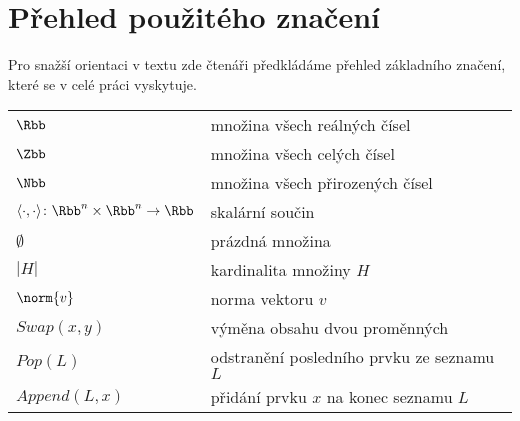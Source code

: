 \chapter*{Přehled použitého značení}

Pro snažší orientaci v textu zde čtenáři předkládáme přehled základního značení, které se v celé práci vyskytuje.
\begin{flushleft}
\begin{longtable}[l]{ll} %
  $\Rbb$                    & množina všech reálných čísel \\[1mm]
  $\Zbb$                    & množina všech celých čísel \\[1mm]
  $\Nbb$                    & množina všech přirozených čísel\\[1mm]
  $ \langle \cdot, \cdot \rangle \colon \Rbb^n \times \Rbb^n \to \Rbb $ & skalární součin \\[1mm]
  $ \emptyset $            & prázdná množina \\[1mm]
  $ |H| $                  & kardinalita množiny $H$ \\[1mm]
  $ \norm{v} $             & norma vektoru $v$ \\[1mm]
  $ Swap(x, y) $           & výměna obsahu dvou proměnných \\[1mm]
  $ Pop(L) $               & odstranění posledního prvku ze seznamu $L$ \\[1mm]
  $ Append(L, x) $         & přidání prvku $x$ na konec seznamu $L$ \\[1mm]
\end{longtable}
\end{flushleft}
